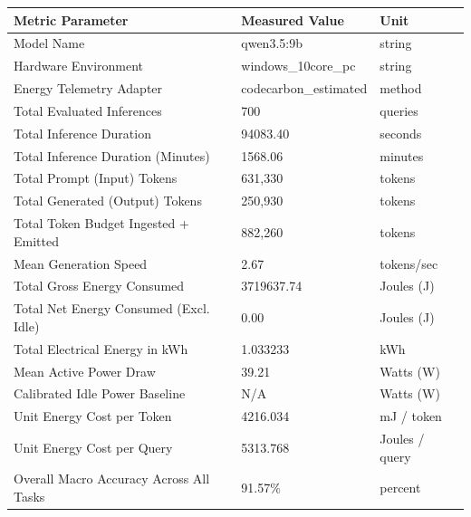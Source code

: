 \begin{tabular}{lll}
\toprule
Metric Parameter & Measured Value & Unit \\
\midrule
Model Name & qwen3.5:9b & string \\
Hardware Environment & windows\_10core\_pc & string \\
Energy Telemetry Adapter & codecarbon\_estimated & method \\
Total Evaluated Inferences & 700 & queries \\
Total Inference Duration & 94083.40 & seconds \\
Total Inference Duration (Minutes) & 1568.06 & minutes \\
Total Prompt (Input) Tokens & 631,330 & tokens \\
Total Generated (Output) Tokens & 250,930 & tokens \\
Total Token Budget Ingested + Emitted & 882,260 & tokens \\
Mean Generation Speed & 2.67 & tokens/sec \\
Total Gross Energy Consumed & 3719637.74 & Joules (J) \\
Total Net Energy Consumed (Excl. Idle) & 0.00 & Joules (J) \\
Total Electrical Energy in kWh & 1.033233 & kWh \\
Mean Active Power Draw & 39.21 & Watts (W) \\
Calibrated Idle Power Baseline & N/A & Watts (W) \\
Unit Energy Cost per Token & 4216.034 & mJ / token \\
Unit Energy Cost per Query & 5313.768 & Joules / query \\
Overall Macro Accuracy Across All Tasks & 91.57\% & percent \\
\bottomrule
\end{tabular}

